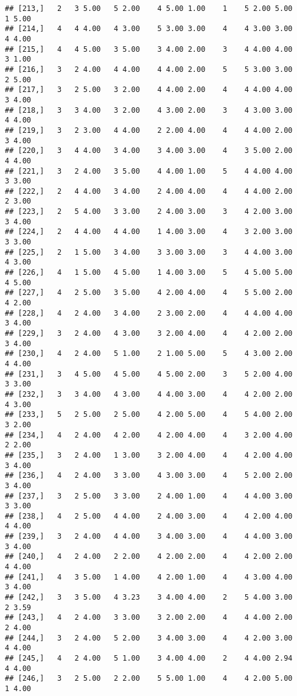 \documentclass[]{article}
\begin{document}
\begin{verbatim}
## [213,]   2   3 5.00   5 2.00    4 5.00 1.00    1    5 2.00 5.00    1 5.00
## [214,]   4   4 4.00   4 3.00    5 3.00 3.00    4    4 3.00 3.00    4 4.00
## [215,]   4   4 5.00   3 5.00    3 4.00 2.00    3    4 4.00 4.00    3 1.00
## [216,]   3   2 4.00   4 4.00    4 4.00 2.00    5    5 3.00 3.00    2 5.00
## [217,]   3   2 5.00   3 2.00    4 4.00 2.00    4    4 4.00 4.00    3 4.00
## [218,]   3   3 4.00   3 2.00    4 3.00 2.00    3    4 3.00 3.00    4 4.00
## [219,]   3   2 3.00   4 4.00    2 2.00 4.00    4    4 4.00 2.00    3 4.00
## [220,]   3   4 4.00   3 4.00    3 4.00 3.00    4    3 5.00 2.00    4 4.00
## [221,]   3   2 4.00   3 5.00    4 4.00 1.00    5    4 4.00 4.00    3 3.00
## [222,]   2   4 4.00   3 4.00    2 4.00 4.00    4    4 4.00 2.00    2 3.00
## [223,]   2   5 4.00   3 3.00    2 4.00 3.00    3    4 2.00 3.00    3 4.00
## [224,]   2   4 4.00   4 4.00    1 4.00 3.00    4    3 2.00 3.00    3 3.00
## [225,]   2   1 5.00   3 4.00    3 3.00 3.00    3    4 4.00 3.00    4 3.00
## [226,]   4   1 5.00   4 5.00    1 4.00 3.00    5    4 5.00 5.00    4 5.00
## [227,]   4   2 5.00   3 5.00    4 2.00 4.00    4    5 5.00 2.00    4 2.00
## [228,]   4   2 4.00   3 4.00    2 3.00 2.00    4    4 4.00 4.00    3 4.00
## [229,]   3   2 4.00   4 3.00    3 2.00 4.00    4    4 2.00 2.00    3 4.00
## [230,]   4   2 4.00   5 1.00    2 1.00 5.00    5    4 3.00 2.00    4 4.00
## [231,]   3   4 5.00   4 5.00    4 5.00 2.00    3    5 2.00 4.00    3 3.00
## [232,]   3   3 4.00   4 3.00    4 4.00 3.00    4    4 2.00 2.00    4 3.00
## [233,]   5   2 5.00   2 5.00    4 2.00 5.00    4    5 4.00 2.00    3 2.00
## [234,]   4   2 4.00   4 2.00    4 2.00 4.00    4    3 2.00 4.00    2 2.00
## [235,]   3   2 4.00   1 3.00    3 2.00 4.00    4    4 2.00 4.00    3 4.00
## [236,]   4   2 4.00   3 3.00    4 3.00 3.00    4    5 2.00 2.00    3 4.00
## [237,]   3   2 5.00   3 3.00    2 4.00 1.00    4    4 4.00 3.00    3 3.00
## [238,]   4   2 5.00   4 4.00    2 4.00 3.00    4    4 2.00 4.00    4 4.00
## [239,]   3   2 4.00   4 4.00    3 4.00 3.00    4    4 4.00 3.00    3 4.00
## [240,]   4   2 4.00   2 2.00    4 2.00 2.00    4    4 2.00 2.00    4 4.00
## [241,]   4   3 5.00   1 4.00    4 2.00 1.00    4    4 3.00 4.00    3 4.00
## [242,]   3   3 5.00   4 3.23    3 4.00 4.00    2    5 4.00 3.00    2 3.59
## [243,]   4   2 4.00   3 3.00    3 2.00 2.00    4    4 4.00 2.00    2 4.00
## [244,]   3   2 4.00   5 2.00    3 4.00 3.00    4    4 2.00 3.00    4 4.00
## [245,]   4   2 4.00   5 1.00    3 4.00 4.00    2    4 4.00 2.94    4 4.00
## [246,]   3   2 5.00   2 2.00    5 5.00 1.00    4    4 2.00 5.00    1 4.00

\end{verbatim}
\end{document}
